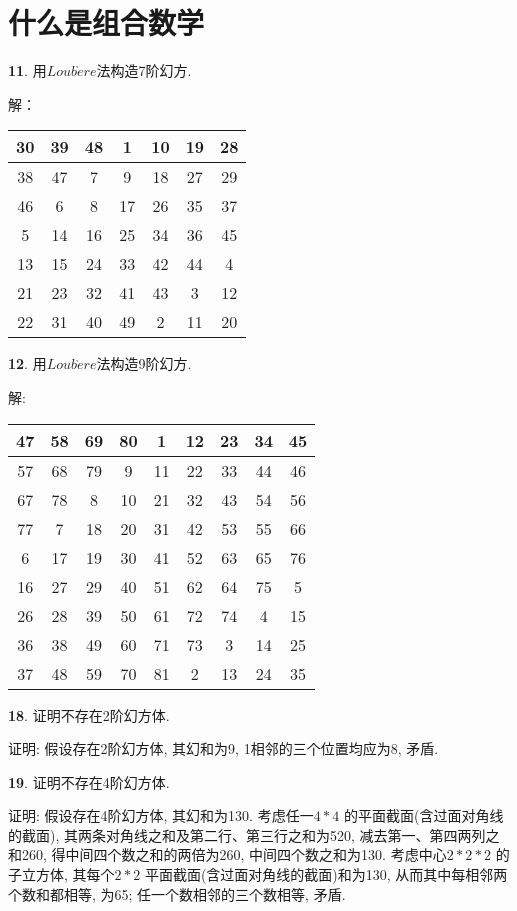 
\section{什么是组合数学}

\par \textbf{11}. 用$Loub\grave{e}re$法构造7阶幻方.

\par 解：
\par
\begin{tabular}{|c|c|c|c|c|c|c|}
\hline
30&39&48&1&10&19&28\\
\hline
38&47&7&9&18&27&29\\
\hline
46&6&8&17&26&35&37\\
\hline
5&14&16&25&34&36&45\\
\hline
13&15&24&33&42&44&4\\
\hline
21&23&32&41&43&3&12\\
\hline
22&31&40&49&2&11&20\\
\hline
\end{tabular}

\par \textbf{12}. 用$Loub\grave{e}re$法构造9阶幻方.
\par 解:
\par
\begin{tabular}{|c|c|c|c|c|c|c|c|c|}
\hline
47&58&69&80&1&12&23&34&45\\
\hline
57&68&79&9&11&22&33&44&46\\
\hline
67&78&8&10&21&32&43&54&56\\
\hline
77&7&18&20&31&42&53&55&66\\
\hline
6&17&19&30&41&52&63&65&76\\
\hline
16&27&29&40&51&62&64&75&5\\
\hline
26&28&39&50&61&72&74&4&15\\
\hline
36&38&49&60&71&73&3&14&25\\
\hline
37&48&59&70&81&2&13&24&35\\
\hline
\end{tabular}

\par \textbf{18}. 证明不存在2阶幻方体.
\par 证明: 假设存在2阶幻方体, 其幻和为9, 1相邻的三个位置均应为8, 矛盾.

\par \textbf{19}. 证明不存在4阶幻方体.
\par 证明: 假设存在4阶幻方体, 其幻和为130. 考虑任一$4*4$ 的平面截面(含过面对角线的截面), 其两条对角线之和及第二行、第三行之和为520, 减去第一、第四两列之和260, 得中间四个数之和的两倍为260, 中间四个数之和为130. 考虑中心$2*2*2$ 的子立方体, 其每个$2*2$ 平面截面(含过面对角线的截面)和为130, 从而其中每相邻两个数和都相等, 为65; 任一个数相邻的三个数相等, 矛盾.

